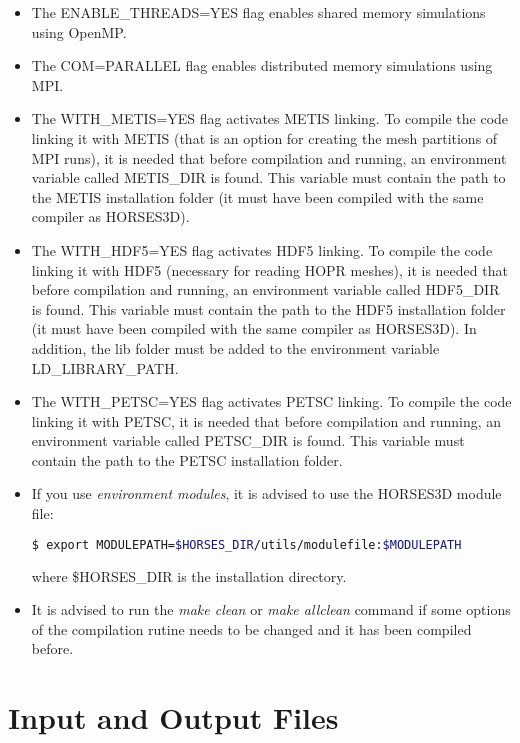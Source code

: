 \documentclass[a4paper,10pt]{report}
\begin{document}
\begin{itemize}
\item The ENABLE\_THREADS=YES flag enables shared memory simulations using OpenMP.

\item The COM=PARALLEL flag enables distributed memory simulations using MPI.

\item The WITH\_METIS=YES flag activates METIS linking. To compile the code linking it with METIS (that is an option for creating the mesh partitions of MPI runs), it is needed that before compilation and running, an environment variable called METIS\_DIR is found. This variable must contain the path to the METIS installation folder (it must have been compiled with the same compiler as HORSES3D).

\item The WITH\_HDF5=YES flag activates HDF5 linking. To compile the code linking it with HDF5 (necessary for reading HOPR meshes), it is needed that before compilation and running, an environment variable called HDF5\_DIR is found. This variable must contain the path to the HDF5 installation folder (it must have been compiled with the same compiler as HORSES3D). In addition, the lib folder must be added to the environment variable LD\_LIBRARY\_PATH.

\item The WITH\_PETSC=YES flag activates PETSC linking. To compile the code linking it with PETSC, it is needed that before compilation and running, an environment variable called PETSC\_DIR is found. This variable must contain the path to the PETSC installation folder.

\item If you use \textit{environment modules}, it is advised to use the HORSES3D module file:\\
\begin{lstlisting}[language=bash]
	$ export MODULEPATH=$HORSES_DIR/utils/modulefile:$MODULEPATH
\end{lstlisting}
where \$HORSES\_DIR is the installation directory.

\item It is advised to run the \emph{make clean} or \emph{make allclean} command if some options of the compilation rutine needs to be changed and it has been compiled before.

\end{itemize}

\chapter{Input and Output Files}
\end{document}
